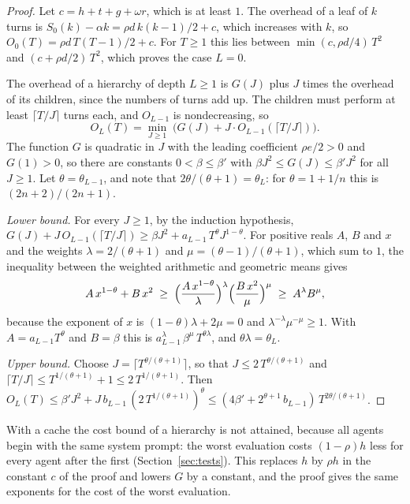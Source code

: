 \documentclass[acmsmall,nonacm,screen]{acmart}
\begin{document}
\begin{proof}
Let $c = h + t + g + \omega r$, which is at least $1$. The overhead of a leaf of $k$ turns is
$S_0(k) - \alpha k = \rho d\,k(k-1)/2 + c$, which increases with $k$, so
$O_0(T) = \rho d\,T(T-1)/2 + c$. For $T \ge 1$ this lies between $\min(c, \rho d/4)\,T^2$ and
$(c + \rho d/2)\,T^2$, which proves the case $L = 0$.

The overhead of a hierarchy of depth $L \ge 1$ is $G(J)$ plus $J$ times the overhead of its
children, since the numbers of turns add up. The children must perform at least
$\lceil T/J \rceil$ turns each, and $O_{L-1}$ is nondecreasing, so
\[
O_L(T) = \min_{J \ge 1}\; \bigl( G(J) + J \cdot O_{L-1}(\lceil T/J \rceil) \bigr) .
\]
The function $G$ is quadratic in $J$ with the leading coefficient $\rho e/2 > 0$ and
$G(1) > 0$, so there are constants $0 < \beta \le \beta'$ with
$\beta J^2 \le G(J) \le \beta' J^2$ for all $J \ge 1$. Let $\theta = \theta_{L-1}$, and note
that $2\theta/(\theta + 1) = \theta_L$: for $\theta = 1 + 1/n$ this is
$(2n + 2)/(2n + 1)$.

\emph{Lower bound.} For every $J \ge 1$, by the induction hypothesis,
$G(J) + J\,O_{L-1}(\lceil T/J \rceil) \ge \beta J^2 + a_{L-1}\,T^\theta J^{1-\theta}$. For
positive reals $A$, $B$ and $x$ and the weights $\lambda = 2/(\theta+1)$ and
$\mu = (\theta - 1)/(\theta + 1)$, which sum to $1$, the inequality between the weighted
arithmetic and geometric means gives
\[
A\,x^{1-\theta} + B\,x^2 \;\ge\; \Bigl(\frac{A\,x^{1-\theta}}{\lambda}\Bigr)^{\lambda}
\Bigl(\frac{B\,x^2}{\mu}\Bigr)^{\mu} \;\ge\; A^\lambda B^\mu ,
\]
because the exponent of $x$ is $(1-\theta)\lambda + 2\mu = 0$ and
$\lambda^{-\lambda}\mu^{-\mu} \ge 1$. With $A = a_{L-1}T^\theta$ and $B = \beta$ this is
$a_{L-1}^{\lambda}\,\beta^{\mu}\,T^{\theta\lambda}$, and $\theta\lambda = \theta_L$.

\emph{Upper bound.} Choose $J = \lceil T^{\theta/(\theta+1)} \rceil$, so that
$J \le 2\,T^{\theta/(\theta+1)}$ and
$\lceil T/J \rceil \le T^{1/(\theta+1)} + 1 \le 2\,T^{1/(\theta+1)}$. Then
$O_L(T) \le \beta' J^2 + J\,b_{L-1}\,(2\,T^{1/(\theta+1)})^{\theta}
\le (4\beta' + 2^{\theta+1}\,b_{L-1})\,T^{2\theta/(\theta+1)}$.
\end{proof}

With a cache the cost bound of a hierarchy is not attained, because all agents begin with the
same system prompt: the worst evaluation costs $(1-\rho)h$ less for every agent after the
first (Section~\ref{sec:tests}). This replaces $h$ by $\rho h$ in the constant $c$ of the
proof and lowers $G$ by a constant, and the proof gives the same exponents for the cost of
the worst evaluation.
\end{document}
